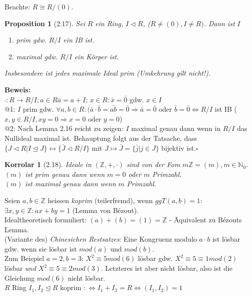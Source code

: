\documentclass[10pt,a4paper]{article}
\newtheorem{korr}{Korrolar}
\newtheorem{prop}{Proposition}
\begin{document}
\smallskip
Beachte: $R \cong R/(0)$.
\begin{prop}[2.17]
 Sei $R$ ein Ring, $I \triangleleft R$, ($R \neq (0), I \neq R)$. Dann ist $I$
 \begin{enumerate}
  \item prim gdw. $R/I$ ein IB ist.
  \item maximal gdw. $R/I$ ein Körper ist.
 \end{enumerate}
Insbesondere ist jedes \emph{maximale Ideal} prim (Umkehrung gilt nicht!).
\end{prop}
\textbf{Beweis:}\\
$\bar{ } : R \rightarrow R/I; a \in R \bar{a} = a + I$; $x \in R : \bar{x} = \bar{0}$ gdw. $x \in I$\\
@1: $I$ prim gdw. $\forall a,b \in R : (\bar{a}\cdot \bar{b} = \bar{ab} = \bar{0}\Rightarrow \bar{a} = \bar{0} \textrm{ oder } \bar{b} = \bar{0} \Leftrightarrow R/I$ ist IB ($x,y \in R/I, xy = 0 \Rightarrow x =0 \textrm{ oder } y = 0$)\\
@2: Nach Lemma 2.16 reicht zu zeigen: $I$ maximal genau dann wenn in $R/I$ das Nullideal maximal ist. Behauptung folgt aus der Tatsache, dass $\lbrace J \triangleleft R | I \trianglelefteq J \rbrace \leftrightarrow \lbrace \bar J \triangleleft R/I \rbrace$ mit $J \mapsto \bar J = \lbrace \bar j|j\in J\rbrace$ bijektiv ist.$\square$

\begin{korr}[2.18]
 Ideale in $(\mathbb{Z},+,\cdot)$ sind von der Fom $m\mathbb{Z} = (m), m \in \mathbb{N}_0$.\\
 $(m)$ ist \emph{prim} genau dann wenn $m = 0$ oder $m$ Primzahl.\\
 $(m)$ ist \emph{maximal} genau dann wenn $m$ Primzahl.\\
\end{korr}
Seien $a,b \in \mathbb{Z}$ heissen \emph{koprim} (teilerfremd), wenn $ggT(a,b) = 1$: $\exists x,y \in \mathbb{Z}: ax + by = 1$ (Lemma von Bézout).\\
Idealtheoretisch formuliert: $(a) + (b) = (1) = \mathbb{Z}$ - Äquivalent zu Bézouts Lemma.\\
(Variante des) \emph{Chinesichen Restsatzes}: Eine Kongruenz modulo $a \cdot b$ ist lösbar gdw. wenn sie lösbar ist $mod (a)$ und $mod (b)$.\\
Zum Beispiel $a = 2, b = 3$: $X^2 \equiv 5 mod (6)$ lösbar gdw. $X^2 \equiv 5 \equiv 1 mod (2)$ lösbar \emph{und} $X^2 \equiv 5 \equiv 2 mod (3)$. Letzteres ist aber nicht lösbar, also ist die Gleichung $mod (6)$ nicht lösbar.\\
$R$ Ring $I_1, I_2 \trianglelefteq R$ koprim $:\Leftrightarrow I_1 + I_2 = R \Leftrightarrow (I_1,I_2) = 1$
\end{document}
